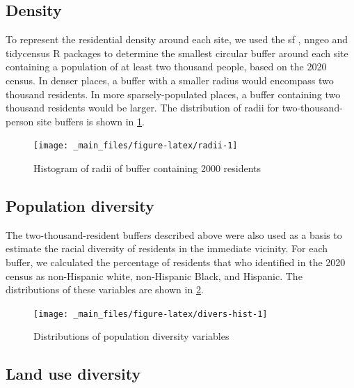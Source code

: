 \documentclass[
]{book}
\begin{document}
\hypertarget{density}{%
\subsection{Density}\label{density}}

To represent the residential density around each site, we used the sf \citep{sf}, nngeo
\citep{nngeo} and tidycensus \citep{tidycensus} R packages to determine the smallest circular
buffer around each site containing a population of at least two thousand people,
based on the 2020 census. In denser places, a buffer with a smaller radius would
encompass two thousand residents. In more sparsely-populated places, a buffer
containing two thousand residents would be larger. The distribution of radii for
two-thousand-person site buffers is shown in \ref{fig:radii}.

\begin{figure}

{\centering \texttt{[image: \_main\_files/figure-latex/radii-1]} 

}

\caption{Histogram of radii of buffer containing 2000 residents}\label{fig:radii}
\end{figure}

\hypertarget{population-diversity}{%
\subsection{Population diversity}\label{population-diversity}}

The two-thousand-resident buffers described above were also used as a basis to
estimate the racial diversity of residents in the immediate vicinity. For each
buffer, we calculated the percentage of residents that who identified in the 2020
census as non-Hispanic white, non-Hispanic Black, and Hispanic. The distributions
of these variables are shown in \ref{fig:divers-hist}.

\begin{figure}

{\centering \texttt{[image: \_main\_files/figure-latex/divers-hist-1]} 

}

\caption{Distributions of population diversity variables}\label{fig:divers-hist}
\end{figure}

\hypertarget{land-use-diversity}{%
\subsection{Land use diversity}\label{land-use-diversity}}
\end{document}
